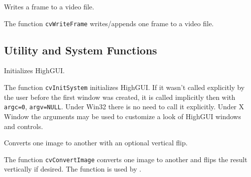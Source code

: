 Writes a frame to a video file.


\begin{description}
\end{description}

The function \texttt{cvWriteFrame} writes/appends one frame to a video file.

\subsection{Utility and System Functions}


Initializes HighGUI.


\begin{description}
\end{description}

The function \texttt{cvInitSystem} initializes HighGUI. If it wasn't
called explicitly by the user before the first window was created, it is
called implicitly then with \texttt{argc=0}, \texttt{argv=NULL}. Under
Win32 there is no need to call it explicitly. Under X Window the arguments
may be used to customize a look of HighGUI windows and controls.


Converts one image to another with an optional vertical flip.


\begin{description}
\end{description}

The function \texttt{cvConvertImage} converts one image to another and flips the result vertically if desired. The function is used by .
